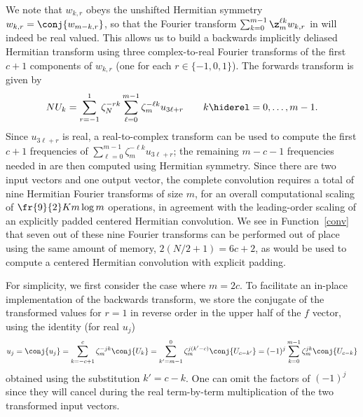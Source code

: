 \documentclass[final]{siamltex}
\def\bel{\begin{dmath}}
\def\eel{\end{dmath}}
\def\no{\hiderel}
\begin{document}
We note that $w_{k,r}$ obeys the unshifted Hermitian symmetry 
$w_{k,r}=\conj{w_{m-k,r}}$, so that the Fourier transform
$\sum_{k=0}^{m-1}\z_m^{\ell k} w_{k,r}$ in  will indeed
be real valued. This allows us to build a backwards implicitly deliased
Hermitian transform using three complex-to-real Fourier transforms of the
first $c+1$ components of $w_{k,r}$ (one for each $r\in\{-1,0,1\}$). The
forwards transform is given by
\bel
NU_k
=\sum_{r=-1}^{1}\zeta_N^{-rk}\sum_{\ell=0}^{m-1}\zeta_m^{-\ell k} u_{3\ell+r}
\qquad k\no =0,\ldots,m-1.\label{fft0forwardsB}
\eel
Since $u_{3\ell+r}$ is real, a real-to-complex transform can be used to
compute the first $c+1$ frequencies of
$\sum_{\ell=0}^{m-1}\zeta_m^{-\ell k} u_{3\ell+r}$; the remaining $m-c-1$
frequencies needed in  are then computed using Hermitian
symmetry. Since there are two input vectors and
one output vector, the complete convolution requires a total of nine
Hermitian Fourier transforms of size $m$, for an overall computational
scaling of $\fr{9}{2}K m \log m$ operations, in agreement with the
leading-order scaling of an explicitly padded centered Hermitian convolution.
We see in Function~\ref{conv} that seven out of these nine Fourier
transforms can be performed out of place using the same amount of memory,
$2(N/2+1)=6c+2$, as would be used to compute a centered Hermitian convolution with
explicit padding.

For simplicity, we first consider the case where $m=2c$.
To facilitate an in-place implementation of the backwards transform, we
store the conjugate of the transformed values for $r=1$ in reverse order in
the upper half of the $f$ vector, using the identity (for real $u_j$)
$$
u_j=\conj{u_j}=\sum_{k=-c+1}^{c}\zeta_m^{-jk} \conj{U_k}
=\sum_{k'=m-1}^{0}\zeta_m^{j(k'-c)} \conj{U_{c-k'}}
=(-1)^j\sum_{k=0}^{m-1}\zeta_m^{jk} \conj{U_{c-k}}
$$
obtained using the substitution $k'=c-k$. One can omit the factors of
$(-1)^j$ since they will cancel during the real term-by-term multiplication
of the two transformed input vectors.
\end{document}
